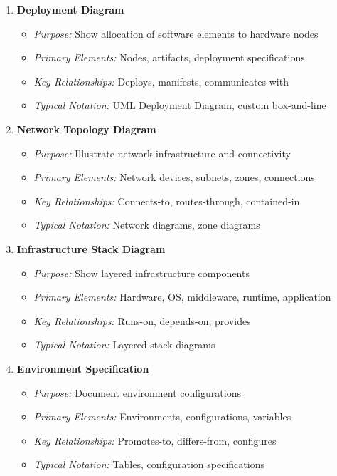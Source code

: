 \documentclass[11pt,letterpaper]{article}
\begin{document}
\begin{enumerate}[label=\textbf{MT\arabic*:}, leftmargin=2.5em]
    \item \textbf{Deployment Diagram}
    \begin{itemize}[nosep]
        \item \textit{Purpose:} Show allocation of software elements to hardware nodes
        \item \textit{Primary Elements:} Nodes, artifacts, deployment specifications
        \item \textit{Key Relationships:} Deploys, manifests, communicates-with
        \item \textit{Typical Notation:} UML Deployment Diagram, custom box-and-line
    \end{itemize}
    
    \item \textbf{Network Topology Diagram}
    \begin{itemize}[nosep]
        \item \textit{Purpose:} Illustrate network infrastructure and connectivity
        \item \textit{Primary Elements:} Network devices, subnets, zones, connections
        \item \textit{Key Relationships:} Connects-to, routes-through, contained-in
        \item \textit{Typical Notation:} Network diagrams, zone diagrams
    \end{itemize}
    
    \item \textbf{Infrastructure Stack Diagram}
    \begin{itemize}[nosep]
        \item \textit{Purpose:} Show layered infrastructure components
        \item \textit{Primary Elements:} Hardware, OS, middleware, runtime, application
        \item \textit{Key Relationships:} Runs-on, depends-on, provides
        \item \textit{Typical Notation:} Layered stack diagrams
    \end{itemize}
    
    \item \textbf{Environment Specification}
    \begin{itemize}[nosep]
        \item \textit{Purpose:} Document environment configurations
        \item \textit{Primary Elements:} Environments, configurations, variables
        \item \textit{Key Relationships:} Promotes-to, differs-from, configures
        \item \textit{Typical Notation:} Tables, configuration specifications
    \end{itemize}
    

\end{enumerate}
\end{document}
